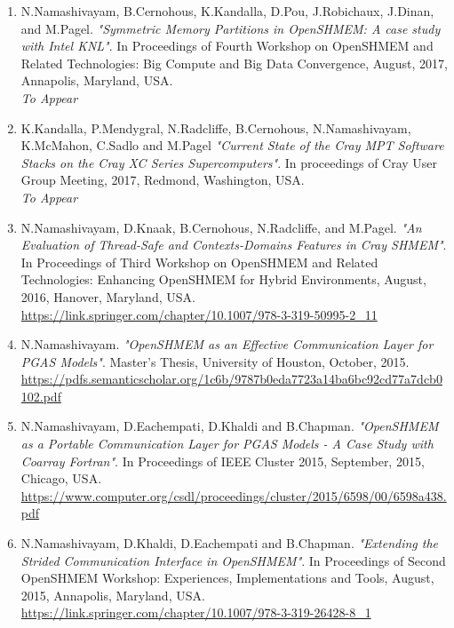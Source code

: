 \begin{enumerate}
\setcounter{enumi}{0}
\item N.Namashivayam, B.Cernohous, K.Kandalla, D.Pou,
      J.Robichaux, J.Dinan, and M.Pagel.
      \textit{"Symmetric Memory Partitions in OpenSHMEM: A case study with
      Intel KNL"}. In Proceedings of Fourth Workshop on OpenSHMEM and
      Related Technologies: Big Compute and Big Data Convergence, August,
      2017, Annapolis, Maryland, USA.\\
      \textit{To Appear}
\item K.Kandalla, P.Mendygral, N.Radcliffe, B.Cernohous,
      N.Namashivayam, K.McMahon, C.Sadlo and M.Pagel
      \textit{"Current State of the Cray MPT Software Stacks on the Cray XC
      Series Supercomputers"}. In proceedings of Cray User Group Meeting,
      2017, Redmond, Washington, USA.\\
      \textit{To Appear}
\item N.Namashivayam, D.Knaak, B.Cernohous, N.Radcliffe, and
      M.Pagel.
      \textit{"An Evaluation of Thread-Safe and Contexts-Domains Features in
      Cray SHMEM"}. In Proceedings of Third Workshop on OpenSHMEM and Related
      Technologies: Enhancing OpenSHMEM for Hybrid Environments, August, 2016,
      Hanover, Maryland, USA.\\
      \url{https://link.springer.com/chapter/10.1007/978-3-319-50995-2_11}
\item N.Namashivayam.
      \textit{"OpenSHMEM as an Effective Communication Layer for PGAS Models"}.
      Master's Thesis, University of Houston, October, 2015.\\
      \url{https://pdfs.semanticscholar.org/1c6b/9787b0eda7723a14ba6bc92cd77a7dcb0102.pdf}
\item N.Namashivayam, D.Eachempati, D.Khaldi and B.Chapman.
      \textit{"OpenSHMEM as a Portable Communication Layer for PGAS Models - A
      Case Study with Coarray Fortran"}. In Proceedings of IEEE Cluster 2015,
      September, 2015, Chicago, USA.\\
      \url{https://www.computer.org/csdl/proceedings/cluster/2015/6598/00/6598a438.pdf}
\item N.Namashivayam, D.Khaldi, D.Eachempati and B.Chapman.
      \textit{"Extending the Strided Communication Interface in OpenSHMEM"}. In
      Proceedings of Second OpenSHMEM Workshop: Experiences, Implementations and
      Tools, August, 2015, Annapolis, Maryland, USA.\\
      \url{https://link.springer.com/chapter/10.1007/978-3-319-26428-8_1}

\end{enumerate}
